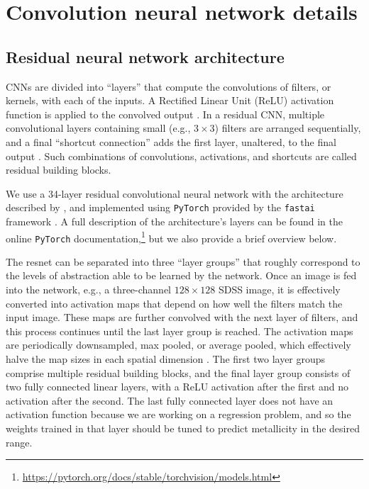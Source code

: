 \documentclass[fleqn,usenatbib]{mnras}
\newcommand{\eg}{e.g.}
\begin{document}




\appendix
%
\section{Convolution neural network details}

\subsection{Residual neural network architecture}
CNNs are divided into ``layers'' that compute the convolutions of filters, or kernels, with each of the inputs.
A Rectified Linear Unit (ReLU) activation function is applied to the convolved output \citep[ReLUs have been shown to propagate information about the relative importances of different features, and are effective for training deep neural networks;][]{Nair2010}.
In a residual CNN, multiple convolutional layers containing small (e.g., $3\times 3$) filters are arranged sequentially, and a final ``shortcut connection'' adds the first layer, unaltered, to the final output \citep[before the final ReLU activation; see, e.g., Figure~2 of][]{He2015}.
Such combinations of convolutions, activations, and shortcuts are called residual building blocks.

We use a 34-layer residual convolutional neural network with the architecture described by \cite{He2015}, and implemented using \texttt{PyTorch} \citep[version 0.3.1;][]{pytorch} provided by the \texttt{fastai} framework \citep[version 0.7;][]{fastai}.
A full description of the architecture's layers can be found in the online \texttt{PyTorch} documentation,\footnote{\url{https://pytorch.org/docs/stable/torchvision/models.html}} but we also provide a brief overview below.

The resnet can be separated into three ``layer groups'' that roughly correspond to the levels of abstraction able to be learned by the network. Once an image is fed into the network, \eg, a three-channel $128\times 128$ SDSS image, it is effectively converted into activation maps that depend on how well the filters match the input image. These maps are further convolved with the next layer of filters, and this process continues until the last layer group is reached. The activation maps are periodically downsampled, max pooled, or average pooled, which effectively halve the map sizes in each spatial dimension \citep[for more about pooling layers in CNNs, see][]{Scherer2010}. The first two layer groups comprise multiple residual building blocks, and the final layer group consists of two fully connected linear layers, with a ReLU activation after the first and no activation after the second. The last fully connected layer does not have an activation function because we are working on a regression problem, and so the weights trained in that layer should be tuned to predict metallicity in the desired range.
\end{document}
